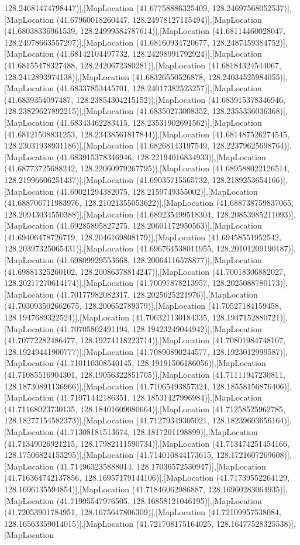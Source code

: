 128.24681474798447)],[MapLocation (41.67758886325409, 128.24697568052537)],[MapLocation (41.67960018260447, 128.24978127115494)],[MapLocation (41.68038336961539, 128.24999584787614)],[MapLocation (41.68114460028047, 128.24978663557297)],[MapLocation (41.68160934720677, 128.2487459384752)],[MapLocation (41.68142104497732, 128.24298991792924)],[MapLocation (41.68155478327488, 128.2420672380281)],[MapLocation (41.68184324544067, 128.2412893974138)],[MapLocation (41.68326550526878, 128.24034525984055)],[MapLocation (41.68337853445701, 128.24017382523257)],[MapLocation (41.6839354097487, 128.23854304215152)],[MapLocation (41.683915378346946, 128.23829627892215)],[MapLocation (41.68350273008352, 128.2355336036368)],[MapLocation (41.68343462283415, 128.23531902691562)],[MapLocation (41.68121508831253, 128.23438561817844)],[MapLocation (41.681487526274545, 128.23031938931186)],[MapLocation (41.68268143197549, 128.22379625698764)],[MapLocation (41.683915378346946, 128.22194016834933)],[MapLocation (41.68773725688242, 128.22060979267795)],[MapLocation (41.689588022126514, 128.21996606251437)],[MapLocation (41.69035715565732, 128.2189253654166)],[MapLocation (41.69021294382075, 128.2159749355002)],[MapLocation (41.688706711983976, 128.21021355053622)],[MapLocation (41.688738759837065, 128.20943034550388)],[MapLocation (41.689235499518304, 128.20853985211093)],[MapLocation (41.69285895827275, 128.20601172950563)],[MapLocation (41.69406478726719, 128.2046169808179)],[MapLocation (41.69458551952542, 128.20397325065431)],[MapLocation (41.696764538011955, 128.20101209190187)],[MapLocation (41.69809929553668, 128.20064116578877)],[MapLocation (41.69881325260102, 128.20086378814247)],[MapLocation (41.70018306882027, 128.20217270614174)],[MapLocation (41.70097878213957, 128.2025088780173)],[MapLocation (41.70177982082317, 128.2025625221976)],[MapLocation (41.703093502662675, 128.200652789379)],[MapLocation (41.70527184159458, 128.1947689322524)],[MapLocation (41.706321130184335, 128.1947152880721)],[MapLocation (41.70705802491194, 128.19423249044942)],[MapLocation (41.70772282486477, 128.19274118223714)],[MapLocation (41.70801984748107, 128.19249441900777)],[MapLocation (41.70890890244577, 128.1923012999587)],[MapLocation (41.710110308540145, 128.19191506186056)],[MapLocation (41.71085516904301, 128.19056322851705)],[MapLocation (41.71111947230811, 128.18730891136966)],[MapLocation (41.71065493857324, 128.18558156876406)],[MapLocation (41.71071442186351, 128.18531427996984)],[MapLocation (41.71168023730135, 128.18401609080664)],[MapLocation (41.71258525962785, 128.18277154582373)],[MapLocation (41.71279349305021, 128.18239603656164)],[MapLocation (41.71308181513674, 128.1817201198899)],[MapLocation (41.71349026921215, 128.17982111590734)],[MapLocation (41.713474251454166, 128.17506824153295)],[MapLocation (41.714010844173615, 128.1721607269608)],[MapLocation (41.714963235888014, 128.17036572530947)],[MapLocation (41.716364742137856, 128.16957179144106)],[MapLocation (41.71739552264129, 128.1696135594854)],[MapLocation (41.71846062986887, 128.16960283064935)],[MapLocation (41.71995547976505, 128.16858121046195)],[MapLocation (41.72053901784951, 128.1675647806309)],[MapLocation (41.72109957538084, 128.16563359014015)],[MapLocation (41.721708175164025, 128.16477528325538)],[MapLocation 